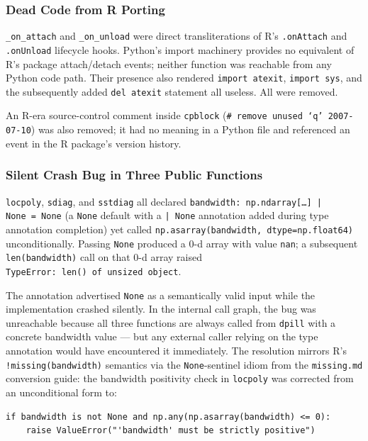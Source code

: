 \documentclass[12pt,a4paper]{article}
\begin{document}
\subsubsection{Dead Code from R Porting}

\texttt{\_on\_attach} and \texttt{\_on\_unload} were direct transliterations of R's \texttt{.onAttach} and \texttt{.onUnload} lifecycle hooks. Python's import machinery provides no equivalent of R's package attach/detach events; neither function was reachable from any Python code path. Their presence also rendered \texttt{import atexit}, \texttt{import sys}, and the subsequently added \texttt{del atexit} statement all useless. All were removed.

An R-era source-control comment inside \texttt{cpblock} (\texttt{\# remove unused `q' 2007-07-10}) was also removed; it had no meaning in a Python file and referenced an event in the R package's version history.

\subsubsection{Silent Crash Bug in Three Public Functions}

\texttt{locpoly}, \texttt{sdiag}, and \texttt{sstdiag} all declared \texttt{bandwidth:~np.ndarray[\ldots]\,|\,None~=~None} (a \texttt{None} default with a \texttt{| None} annotation added during type annotation completion) yet called \texttt{np.asarray(bandwidth, dtype=np.float64)} unconditionally. Passing \texttt{None} produced a 0-d array with value \texttt{nan}; a subsequent \texttt{len(bandwidth)} call on that 0-d array raised \texttt{TypeError:~len()~of~unsized~object}.

The annotation advertised \texttt{None} as a semantically valid input while the implementation crashed silently. In the internal call graph, the bug was unreachable because all three functions are always called from \texttt{dpill} with a concrete bandwidth value --- but any external caller relying on the type annotation would have encountered it immediately. The resolution mirrors R's \texttt{!missing(bandwidth)} semantics via the \texttt{None}-sentinel idiom from the \texttt{missing.md} conversion guide: the bandwidth positivity check in \texttt{locpoly} was corrected from an unconditional form to:

\begin{lstlisting}[style=python]
if bandwidth is not None and np.any(np.asarray(bandwidth) <= 0):
    raise ValueError("'bandwidth' must be strictly positive")
\end{lstlisting}
\end{document}
